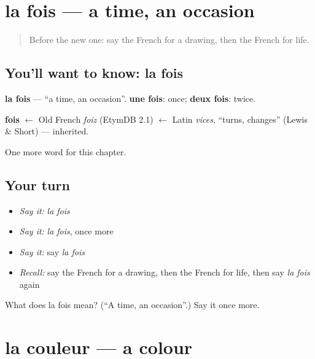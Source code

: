 \section[la fois]{la fois — a time, an occasion}

\label{lesson:FR-C129-fois}



\begin{quote}
Before the new one: say the French for a drawing, then the French for life.
\end{quote}

\subsection*{You'll want to know: la fois}
\textbf{la fois} — \textquotedblleft{}a time, an occasion\textquotedblright{}. \textbf{une fois}: once; \textbf{deux fois}: twice.

\begin{cousinweb}
\textbf{fois} $\leftarrow$ Old French \emph{foiz} (EtymDB 2.1) $\leftarrow$ Latin \emph{vices}, \textquotedblleft{}turns, changes\textquotedblright{} (Lewis \& Short) — inherited.
\end{cousinweb}

\begin{grammarlens}[title={What you've built}]
One more word for this chapter.
\end{grammarlens}

\subsection*{Your turn}
\begin{itemize}
\raggedright
  \item \emph{Say it:} \emph{la fois}
  \item \emph{Say it:} \emph{la fois}, once more
  \item \emph{Say it:} say \emph{la fois}
  \item \emph{Recall:} say the French for a drawing, then the French for life, then say \emph{la fois} again
\end{itemize}

\begin{tcolorbox}[breakable,colback=teal!4,colframe=teal!35!black,title={Before you move on}]
What does la fois mean? (\textquotedblleft{}A time, an occasion\textquotedblright{}.) Say it once more.
\end{tcolorbox}
\section[la couleur]{la couleur — a colour}

